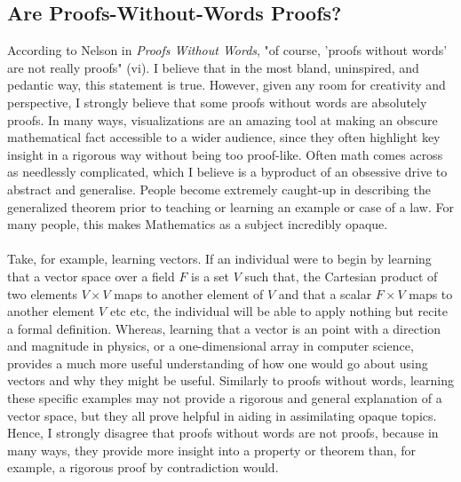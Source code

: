 \documentclass[11pt,a4paper]{article}
\begin{document}
\subsection{Are Proofs-Without-Words Proofs?}
According to Nelson in \textit{Proofs Without Words}, "of course, 'proofs without words' are not really proofs" (vi). I believe that in the most bland, uninspired, and pedantic way, this statement is true. However, given any room for creativity and perspective, I strongly believe that some proofs without words are absolutely proofs. In many ways, visualizations are an amazing tool at making an obscure mathematical fact accessible to a wider audience, since they often highlight key insight in a rigorous way without being too proof-like. Often math comes across as needlessly complicated, which I believe is a byproduct of an obsessive drive to abstract and generalise. People become extremely caught-up in describing the generalized theorem prior to teaching or learning an example or case of a law. For many people, this makes Mathematics as a subject incredibly opaque. \\ \\
	Take, for example, learning vectors. If an individual were to begin by learning that a vector space over a field $F$ is a set $V$ such that, the Cartesian product of two elements $V \times V$ maps to another element of $V$ and that a scalar $F \times V$ maps to another element $V$ etc etc, the individual will be able to apply nothing but recite a formal definition. Whereas, learning that a vector is an point with a direction and magnitude in physics, or a one-dimensional array in computer science, provides a much more useful understanding of how one would go about using vectors and why they might be useful. Similarly to proofs without words, learning these specific examples may not provide a rigorous and general explanation of a vector space, but they all prove helpful in aiding in assimilating opaque topics. Hence, I strongly disagree that proofs without words are not proofs, because in many ways, they provide more insight into a property or theorem than, for example, a rigorous proof by contradiction would.
\end{document}

